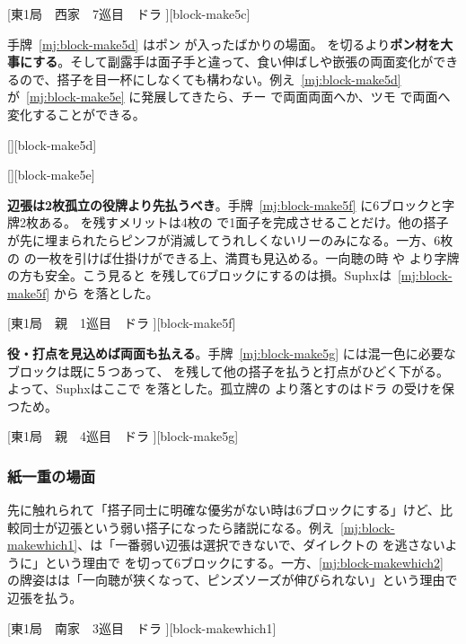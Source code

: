 \documentclass[../nankiru_main.tex]{subfiles}
\begin{document}
[東1局　西家　7巡目　ドラ ][block-make5c]

手牌~\ref{mj:block-make5d} はポン  が入ったばかりの場面。 を切るより\textbf{ポン材を大事にする}\citep{yoteru-6block}。そして副露手は面子手と違って、食い伸ばしや嵌張の両面変化ができるので、搭子を目一杯にしなくても構わない。例え~\ref{mj:block-make5d} が~\ref{mj:block-make5e} に発展してきたら、チー  で両面両面へか、ツモ  で両面へ変化することができる。

[][block-make5d]

[][block-make5e]

\textbf{辺張は2枚孤立の役牌より先払うべき}\citep[][pp.~154--155]{suphx}。手牌~\ref{mj:block-make5f} に6ブロックと字牌2枚ある。 を残すメリットは4枚の  で1面子を完成させることだけ。他の搭子が先に埋まられたらピンフが消滅してうれしくないリーのみになる。一方、6枚の  の一枚を引けば仕掛けができる上、満貫も見込める。一向聴の時  や  より字牌の方も安全。こう見ると  を残して6ブロックにするのは損。Suphxは~\ref{mj:block-make5f} から  を落とした。

[東1局　親　1巡目　ドラ ][block-make5f]

\textbf{役・打点を見込めば両面も払える}\citep[][pp.~156--157]{suphx}。手牌~\ref{mj:block-make5g} には混一色に必要なブロックは既に５つあって、 を残して他の搭子を払うと打点がひどく下がる。よって、Suphxはここで  を落とした。孤立牌の  より落とすのはドラ  の受けを保つため。

[東1局　親　4巡目　ドラ ][block-make5g]


\subsubsection*{紙一重の場面}

先に触れられて「搭子同士に明確な優劣がない時は6ブロックにする」けど、比較同士が辺張という弱い搭子になったら諸説になる。例え~\ref{mj:block-makewhich1}、\citet{yoteru-6block}は「一番弱い辺張は選択できないで、ダイレクトの  を逃さないように」という理由で  を切って6ブロックにする。一方、\ref{mj:block-makewhich2} の牌姿は\citet{yuusee-6block-2}は「一向聴が狭くなって、ピンズソーズが伸びられない」という理由で辺張を払う。

[東1局　南家　3巡目　ドラ ][block-makewhich1]
\end{document}

